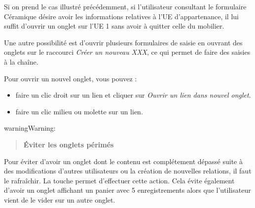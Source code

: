 \documentclass[letterpaper,10pt,french]{sphinxmanual}
\begin{document}
Si on prend le cas illustré précédemment, si l'utilisateur consultant le formulaire Céramique désire avoir les informations relatives à l'UE d'appartenance, il lui suffit d'ouvrir un onglet sur l'UE 1 sans avoir à quitter celle du mobilier.

Une autre possibilité est d'ouvrir plusieurs formulaires de saisie en ouvrant des onglets sur le raccourci \emph{Créer un nouveau XXX}, ce qui permet de faire des saisies à la chaîne.

Pour ouvrir un nouvel onglet, vous pouvez :
\begin{itemize}
\item {} 
faire un clic droit sur un lien et cliquer sur \emph{Ouvrir un lien dans nouvel onglet}.

\item {} 
faire un clic milieu ou molette sur un lien.

\end{itemize}

\begin{notice}{warning}{Warning:}\begin{quote}

\textbf{Éviter les onglets périmés}
\end{quote}

Pour éviter d'avoir un onglet dont le contenu est complétement dépassé suite à des modifications d'autres utilisateurs ou la création de nouvelles relations, il faut le rafraîchir. La touche  permet d'effectuer cette action. Cela évite également d'avoir un onglet affichant un panier avec 5 enregistrements alors que l'utilisateur vient de le vider sur un autre onglet.
\end{notice}
\end{document}

